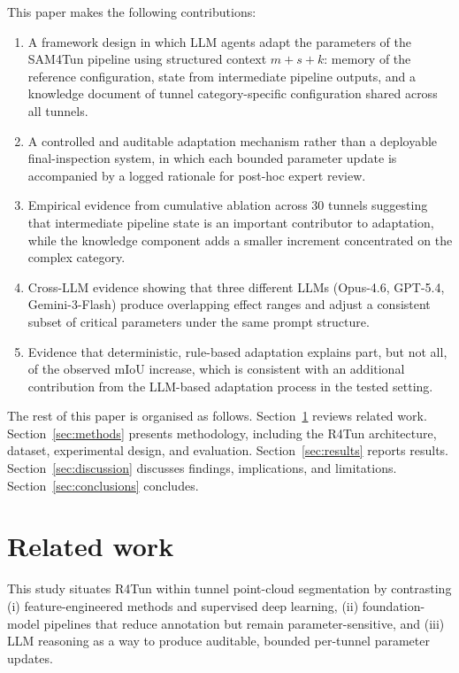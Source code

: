 \documentclass[a4paper,fleqn]{cas-dc}
\begin{document}
{This paper makes the following contributions:
\begin{enumerate}
\item A framework design in which LLM agents adapt the parameters of the SAM4Tun pipeline using structured context $m+s+k$: memory of the reference configuration, state from intermediate pipeline outputs, and a knowledge document of tunnel category-specific configuration shared across all tunnels.
\item A controlled and auditable adaptation mechanism rather than a deployable final-inspection system, in which each bounded parameter update is accompanied by a logged rationale for post-hoc expert review.
\item Empirical evidence from cumulative ablation across 30 tunnels suggesting that intermediate pipeline state is an important contributor to adaptation, while the knowledge component adds a smaller increment concentrated on the complex category.
\item Cross-LLM evidence showing that three different LLMs (Opus-4.6, GPT-5.4, Gemini-3-Flash) produce overlapping effect ranges and adjust a consistent subset of critical parameters under the same prompt structure.
\item Evidence that deterministic, rule-based adaptation explains part, but not all, of the observed mIoU increase, which is consistent with an additional contribution from the LLM-based adaptation process in the tested setting.
\end{enumerate}

The rest of this paper is organised as follows. Section~\ref{sec:related} reviews related work. Section~\ref{sec:methods} presents methodology, including the R4Tun architecture, dataset, experimental design, and evaluation. Section~\ref{sec:results} reports results. Section~\ref{sec:discussion} discusses findings, implications, and limitations. Section~\ref{sec:conclusions} concludes.

\section{Related work}\label{sec:related}
This study situates R4Tun within tunnel point-cloud segmentation by contrasting (i) feature-engineered methods and supervised deep learning, (ii) foundation-model pipelines that reduce annotation but remain parameter-sensitive, and (iii) LLM reasoning as a way to produce auditable, bounded per-tunnel parameter updates.

}
\end{document}
